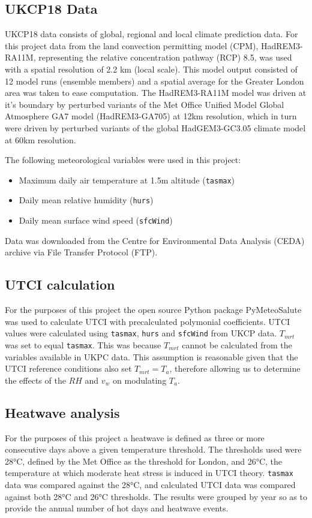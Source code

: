 \documentclass[10pt,letterpaper]{article}
\begin{document}
\subsection*{UKCP18 Data}
UKCP18 data consists of global, regional and local climate prediction data. 
For this project data from the land convection permitting model (CPM), HadREM3-RA11M, representing the relative concentration pathway (RCP) 8.5, was used with a spatial resolution of 2.2 km (local scale).
This model output consisted of 12 model runs (ensemble members) and a spatial average for the Greater London area was taken to ease computation.
The HadREM3-RA11M model was driven at it's boundary by perturbed variants of the Met Office Unified Model Global Atmosphere GA7 model (HadREM3-GA705) at 12km resolution, which in turn were driven by perturbed variants of the global HadGEM3-GC3.05 climate model at 60km resolution.\cite{UKCP18}

\noindent
The following meteorological variables were used in this project:
\begin{itemize}
    \item Maximum daily air temperature at 1.5m altitude (\texttt{tasmax})
    \item Daily mean relative humidity (\texttt{hurs})
    \item Daily mean surface wind speed (\texttt{sfcWind})
\end{itemize}
Data was downloaded from the Centre for Environmental Data Analysis (CEDA) archive via File Transfer Protocol (FTP).\cite{UKCP18data}

\subsection*{UTCI calculation}
For the purposes of this project the open source Python package PyMeteoSalute was used to calculate UTCI with precalculated polymonial coefficients.\cite{pymeteosalute}
UTCI values were calculated using \texttt{tasmax}, \texttt{hurs} and \texttt{sfcWind} from UKCP data.
$T_{mrt}$ was set to equal \texttt{tasmax}.
This was because $T_{mrt}$ cannot be calculated from the variables available in UKPC data.
This assumption is reasonable given that the UTCI reference conditions also set $T_{mrt}=T_a$, therefore allowing us to determine the effects of the $RH$ and $v_w$ on modulating $T_a$.


\subsection*{Heatwave analysis}
For the purposes of this project a heatwave is defined as three or more consecutive days above a given temperature threshold.
The thresholds used were 28°C, defined by the Met Office as the threshold for London\cite{McCarthy2019}, and 26°C, the temperature at which moderate heat stress is induced in UTCI theory.\cite{Blazejczyk2013}
\texttt{tasmax} data was compared against the 28°C, and calculated UTCI data was compared against both 28°C and 26°C thresholds.
The results were grouped by year so as to provide the annual number of hot days and heatwave events.
\end{document}
